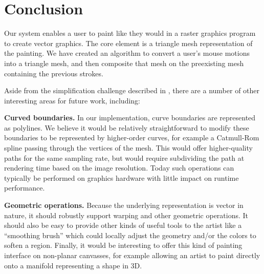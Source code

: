 \documentclass[review]{acmsiggraph}
\begin{document}
\section{Conclusion}
Our system enables a user to paint like they would in a raster graphics program 
to create vector graphics. The core element is a triangle mesh representation of the painting.
We have created an algorithm to convert a user's mouse motions into a triangle mesh, and then composite that mesh on the preexisting mesh containing the previous strokes.

Aside from the simplification challenge described in , there are a number of other interesting areas for future work, including:

\noindent
{\bf Curved boundaries.}
In our implementation, curve boundaries are represented as polylines. We believe it would be relatively straightforward to modify these boundaries to be represented by higher-order curves, 
for example a Catmull-Rom spline passing through the vertices of the mesh. This would offer
higher-quality paths for the same sampling rate, but would require subdividing the path at
rendering time based on the image resolution. Today such operations can typically be 
performed on graphics hardware with little impact on runtime performance.

\noindent
{\bf Geometric operations.}
Because the underlying representation is vector in nature, it should robustly support warping and
other geometric operations. It should also be easy to provide other kinds of useful tools to the 
artist like a ``smoothing brush'' which could locally adjust the geometry and/or the colors to soften a region. Finally, it would be interesting to offer this kind of painting interface on non-planar canvasses, for example allowing an artist to paint directly onto a manifold representing a shape in 3D.




\end{document}
